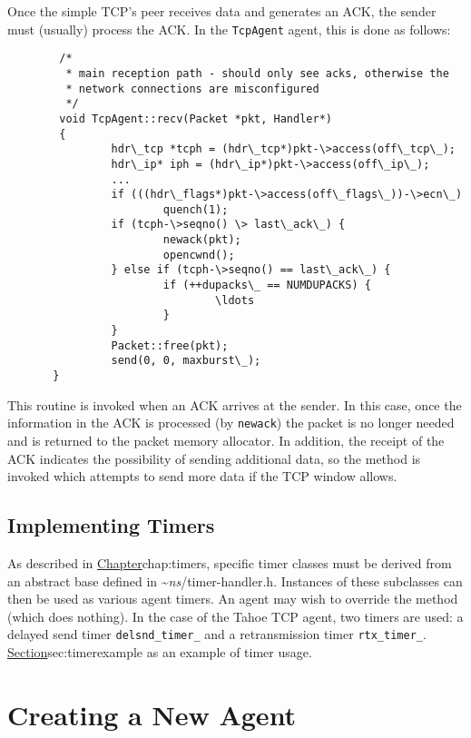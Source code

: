 Once the simple TCP's peer receives data and generates an ACK, the
sender must (usually) process the ACK.
In the {\tt TcpAgent} agent, this is done as follows:
\begin{verbatim}
        /*
         * main reception path - should only see acks, otherwise the
         * network connections are misconfigured
         */
        void TcpAgent::recv(Packet *pkt, Handler*)
        {
                hdr\_tcp *tcph = (hdr\_tcp*)pkt-\>access(off\_tcp\_);
                hdr\_ip* iph = (hdr\_ip*)pkt-\>access(off\_ip\_);
                ...
                if (((hdr\_flags*)pkt-\>access(off\_flags\_))-\>ecn\_)
                        quench(1);
                if (tcph-\>seqno() \> last\_ack\_) {
                        newack(pkt);
                        opencwnd();
                } else if (tcph-\>seqno() == last\_ack\_) {
                        if (++dupacks\_ == NUMDUPACKS) {
                                \ldots
                        }
                }
                Packet::free(pkt);
                send(0, 0, maxburst\_);
       }
\end{verbatim}
This routine is invoked when an ACK arrives at the sender.
In this case, once the information in the ACK is processed (by {\tt newack})
the packet is no longer needed and is returned to the packet memory
allocator.
In addition, the receipt of the ACK indicates the possibility of sending
additional data, so the  method is
invoked which attempts to send more data if the TCP window allows.

\subsection{Implementing Timers}
\label{sec:tcptimer}

As described in 
\href{the following chapter}{Chapter}{chap:timers}, specific
timer classes must be derived from an abstract base
defined in \textasciitilde\emph{ns}/{timer-handler.h}.  Instances of these
subclasses can then be used as various agent timers.
An agent may wish to override the  method
(which does nothing).
In the case of the Tahoe TCP agent, two timers are used:
a delayed send timer {\tt delsnd\_timer\_} 
and a retransmission timer {\tt rtx\_timer\_}.
\href{We describe the retransmission timer in TCP}{Section}{sec:timerexample}
as an example of timer usage.  

\section{Creating a New Agent}
\label{sec:createagent}

